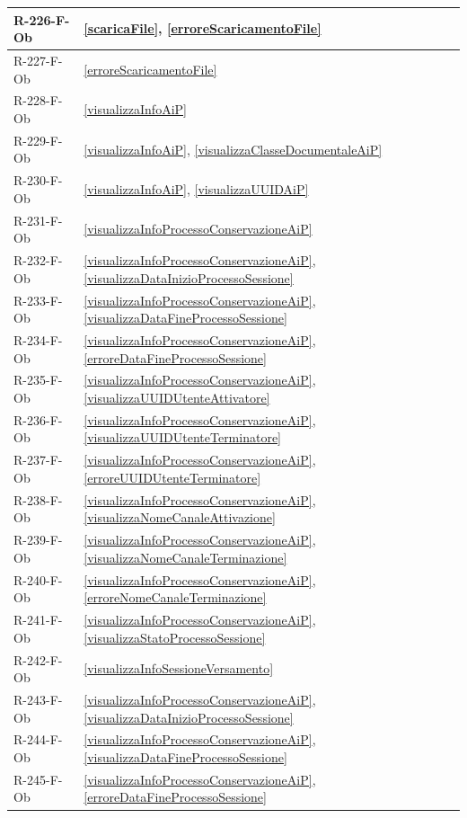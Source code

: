 \begin{longtable}{|p{4cm}|p{10cm}|}
R-226-F-Ob & \ref{scaricaFile}, \ref{erroreScaricamentoFile} \\
\hline
R-227-F-Ob & \ref{erroreScaricamentoFile} \\
\hline
R-228-F-Ob & \ref{visualizzaInfoAiP} \\
\hline
R-229-F-Ob & \ref{visualizzaInfoAiP}, \ref{visualizzaClasseDocumentaleAiP} \\
\hline
R-230-F-Ob & \ref{visualizzaInfoAiP}, \ref{visualizzaUUIDAiP} \\
\hline
R-231-F-Ob & \ref{visualizzaInfoProcessoConservazioneAiP} \\
\hline
R-232-F-Ob & \ref{visualizzaInfoProcessoConservazioneAiP}, \ref{visualizzaDataInizioProcessoSessione} \\
\hline
R-233-F-Ob & \ref{visualizzaInfoProcessoConservazioneAiP}, \ref{visualizzaDataFineProcessoSessione} \\
\hline
R-234-F-Ob & \ref{visualizzaInfoProcessoConservazioneAiP}, \ref{erroreDataFineProcessoSessione} \\
\hline
R-235-F-Ob & \ref{visualizzaInfoProcessoConservazioneAiP}, \ref{visualizzaUUIDUtenteAttivatore} \\
\hline
R-236-F-Ob & \ref{visualizzaInfoProcessoConservazioneAiP}, \ref{visualizzaUUIDUtenteTerminatore} \\
\hline
R-237-F-Ob & \ref{visualizzaInfoProcessoConservazioneAiP}, \ref{erroreUUIDUtenteTerminatore} \\
\hline
R-238-F-Ob & \ref{visualizzaInfoProcessoConservazioneAiP}, \ref{visualizzaNomeCanaleAttivazione} \\
\hline
R-239-F-Ob & \ref{visualizzaInfoProcessoConservazioneAiP}, \ref{visualizzaNomeCanaleTerminazione} \\
\hline
R-240-F-Ob & \ref{visualizzaInfoProcessoConservazioneAiP}, \ref{erroreNomeCanaleTerminazione} \\
\hline
R-241-F-Ob & \ref{visualizzaInfoProcessoConservazioneAiP}, \ref{visualizzaStatoProcessoSessione} \\
\hline
R-242-F-Ob & \ref{visualizzaInfoSessioneVersamento} \\
\hline
R-243-F-Ob & \ref{visualizzaInfoProcessoConservazioneAiP}, \ref{visualizzaDataInizioProcessoSessione} \\
\hline
R-244-F-Ob & \ref{visualizzaInfoProcessoConservazioneAiP}, \ref{visualizzaDataFineProcessoSessione} \\
\hline
R-245-F-Ob & \ref{visualizzaInfoProcessoConservazioneAiP}, \ref{erroreDataFineProcessoSessione} \\

\end{longtable}
